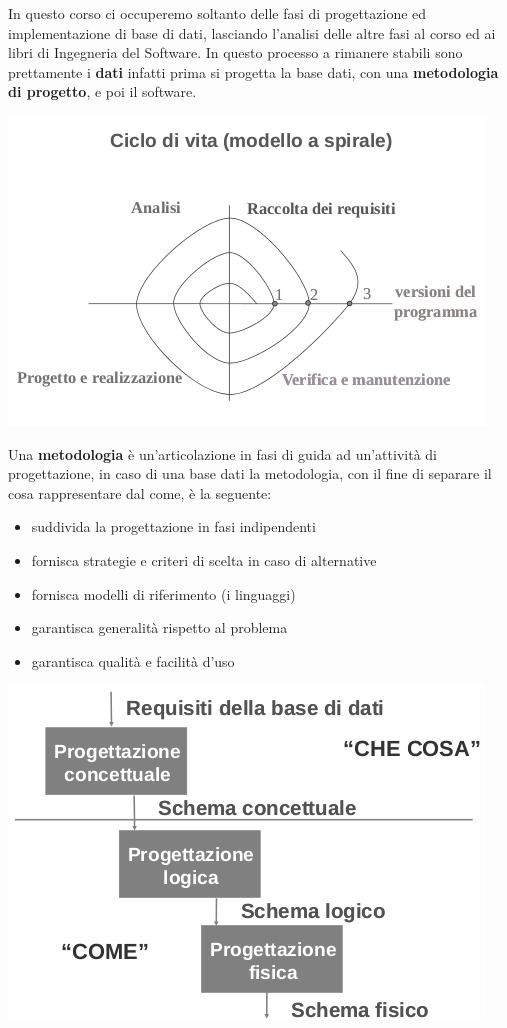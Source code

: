 \documentclass[a4paper,12pt, oneside]{book}
\begin{document}
In questo corso ci occuperemo soltanto delle fasi di progettazione ed implementazione di base di dati,
lasciando l'analisi delle altre fasi al corso ed ai libri di Ingegneria del Software.\newline
In questo processo a rimanere stabili sono prettamente i \textbf{dati} infatti prima si progetta la base dati,
con una \textbf{metodologia di progetto}, e poi il software.
\begin{center}
	\includegraphics[scale=2.8]{img/bas2.png}
\end{center}
Una \textbf{metodologia} è un'articolazione in fasi di guida ad un'attività di progettazione, in caso
di una base dati la metodologia, con il fine di separare il cosa rappresentare dal come, è la seguente:
\begin{itemize}
	\item suddivida la progettazione in fasi indipendenti
	\item fornisca strategie e criteri di scelta in caso di alternative
	\item fornisca modelli di riferimento (i linguaggi)
	\item garantisca generalità rispetto al problema
	\item garantisca qualità e facilità d'uso
\end{itemize}
\begin{center}
	\includegraphics[scale=2.5]{img/bas3.png}
\end{center}
\end{document}
